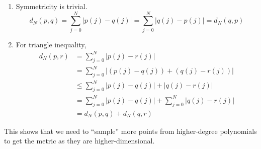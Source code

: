 \begin{solution}
\begin{enumerate}
      \item Symmetricity is trivial. 
      \begin{equation}
        d_N(p,q) = \sum_{j=0}^N |p(j) - q(j)| = \sum_{j=0}^N |q(j) - p(j)| = d_N (q, p)
      \end{equation} 

      \item For triangle inequality, 
      \begin{align}
        d_N (p, r) & = \sum_{j=0}^N |p(j) - r(j)| \\
                   & = \sum_{j=0}^N |(p(j) - q(j)) + (q(j) - r(j))| \\  
                   & \leq \sum_{j=0}^N |p(j) - q(j)| + |q(j) - r(j)| \\
                   & = \sum_{j=0}^N |p(j) - q(j)| + \sum_{j=0}^N |q(j) - r(j)| \\
                   & = d_N (p, q) + d_N (q, r)
      \end{align}
    \end{enumerate}
    This shows that we need to ``sample'' more points from higher-degree polynomials to get the metric as they are higher-dimensional. 
  \end{solution}

